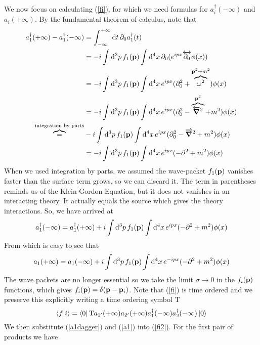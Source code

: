 We now focus on calculating (\ref{fi}), for which we need formulas for $a_i^\dagger(-\infty)$ and $a_i(+\infty)$. By the fundamental theorem of calculus, note that
\begin{equation}
    \begin{aligned}
        a^\dagger_1(+\infty)- a^\dagger_1(-\infty)&=\int_{-\infty}^{+\infty}\dd t\,\partial_0a^\dagger_1(t)\\
        &=-i\int\dd^3p\,f_1(\vb{p})\int\dd^4x\,\partial_0(e^{ipx}\overleftrightarrow{\partial_0}\phi(x))\\
        &=-i\int\dd^3p\,f_1(\vb{p})\int\dd^4x\,e^{ipx}(\partial_0^2+\overbrace{\omega^2}^{\vb{p}^2+m^2})\phi(x)\\
        &=-i\int\dd^3p\,f_1(\vb{p})\int\dd^4x\,e^{ipx}(\partial_0^2-\overbrace{\overleftarrow{\grad}^2}^{\vb{p}^2}+m^2)\phi(x)\\
        \overbrace{=}^{\text{integration by parts}}&-i\int\dd^3p\,f_1(\vb{p})\int\dd^4x\,e^{ipx}(\partial_0^2-\overrightarrow{\grad}^2+m^2)\phi(x)\\
        &=-i\int\dd^3p\,f_1(\vb{p})\int\dd^4x\,e^{ipx}(-\partial^2+m^2)\phi(x)
    \end{aligned}
\end{equation}
When we used integration by parts, we assumed the wave-packet $f_1(\vb{p})$ vanishes faster than the surface term grows, so we can discard it. The term in parentheses reminds us of the Klein-Gordon Equation, but it does not vanishes in an interacting theory. It actually equals the source which gives the theory interactions. So, we have arrived at
\begin{equation}
    a^\dagger_1(-\infty)=a^\dagger_1(+\infty)+i\int\dd^3p\,f_1(\vb{p})\int\dd^4x\,e^{ipx}(-\partial^2+m^2)\phi(x)
    \label{a1dagger}
\end{equation}
From which is easy to see that
\begin{equation}
    a_1(+\infty)=a_1(-\infty)+i\int\dd^3p\,f_1(\vb{p})\int\dd^4x\,e^{-ipx}(-\partial^2+m^2)\phi(x)
    \label{a1}
\end{equation}
The wave packets are no longer essential so we take the limit $\sigma\to0$ in the $f_i(\vb{p})$ functions, which gives $f_i(\vb{p})=\delta(\vb{p}-\vb{p}_i)$. Note that (\ref{fi}) is time ordered and we preserve this explicitly writing a time ordering symbol $\text{T}$
\begin{equation}
    \braket{f}{i}=\bra{0}\text{T}a_{1^\prime}(+\infty)a_{2^\prime}(+\infty)a_1^\dagger(-\infty)a_2^\dagger(-\infty)\ket{0}
    \label{fi2}
\end{equation} We then substitute (\ref{a1dagger}) and (\ref{a1}) into (\ref{fi2}). For the first pair of products we have
